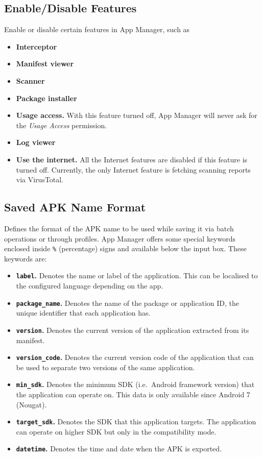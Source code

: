 \subsection{Enable/Disable Features}\label{subsec:enable/disable-features} %
Enable or disable certain features in App Manager, such as
\begin{itemize}
    \item \textbf{Interceptor}
    \item \textbf{Manifest viewer}
    \item \textbf{Scanner}
    \item \textbf{Package installer}
    \item \textbf{Usage access.} With this feature turned off, App Manager will never ask for the \textit{Usage Access} permission.
    \item \textbf{Log viewer}
    \item \textbf{Use the internet.} All the Internet features are disabled if this feature is turned off.
    Currently, the only Internet feature is fetching scanning reports via VirusTotal.
\end{itemize}

\subsection{Saved APK Name Format}\label{subsec:saved-apk-name-format} %
Defines the format of the APK name to be used while saving it via batch operations or through profiles.
App Manager offers some special keywords enclosed inside \texttt{\%} (percentage) signs and available below the input box.
These keywords are:
\begin{itemize}
    \item \textbf{\texttt{label}.} Denotes the name or label of the application. This can be localised to the configured language depending on the app.
    \item \textbf{\texttt{package\_name}.} Denotes the name of the package or application ID, the unique identifier that each application has.
    \item \textbf{\texttt{version}.} Denotes the current version of the application extracted from its manifest.
    \item \textbf{\texttt{version\_code}.} Denotes the current version code of the application that can be used to separate two versions of the same application.
    \item \textbf{\texttt{min\_sdk}.} Denotes the minimum SDK (i.e.\ Android framework version) that the application can operate on. This data is only available since Android 7 (Nougat).
    \item \textbf{\texttt{target\_sdk}.} Denotes the SDK that this application targets. The application can operate on higher SDK but only in the compatibility mode.
    \item \textbf{\texttt{datetime}.} Denotes the time and date when the APK is exported.
\end{itemize}

